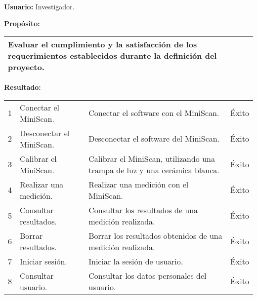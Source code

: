 \textbf{Usuario:} Investigador.

\textbf{Prop\'{o}sito:}
\begin{table}[h]
	\centering
	\setlength{\extrarowheight}{\altocelda}
	\begin{tabularx}{\anchotabla}{|X|}
		\hline
		Evaluar el cumplimiento y la satisfacci\'{o}n de los requerimientos establecidos durante la definici\'{o}n del proyecto.\\ \hline
	\end{tabularx}
\end{table}

\textbf{Resultado:}

\begin{table}[h]
	\centering
	\setlength{\extrarowheight}{\altocelda}
	\begin{tabulary}{\anchotabla}{|c|L|J|c|}
		\hline
		\thead{\textbf{\small{\#}}} &  &  & \\ \hline

			1 & Conectar el \hbox{MiniScan}. & Conectar el software con el MiniScan. & \'{E}xito \\ \hline
		
			2 & Desconectar el \hbox{MiniScan}. & Desconectar el software del MiniScan. & \'{E}xito \\ \hline
			
			3 & Calibrar el \hbox{MiniScan}. & Calibrar el MiniScan, utilizando una trampa de luz y una cer\'{a}mica blanca. & \'{E}xito \\ \hline
			
			4 & Realizar una medici\'{o}n. & Realizar una medici\'{o}n con el MiniScan. & \'{E}xito \\ \hline
			
			5 & Consultar resultados. & Consultar los resultados de una medici\'{o}n realizada. & \'{E}xito \\ \hline
			
			6 & Borrar resultados. & Borrar los resultados obtenidos de una medici\'{o}n realizada. & \'{E}xito \\ \hline
			
			7 & Iniciar sesi\'{o}n. & Iniciar la sesi\'{o}n de usuario. & \'{E}xito \\ \hline
			
			8 & Consultar usuario. & Consultar los datos personales del usuario. & \'{E}xito \\ \hline
			

\end{tabulary}
\end{table}
